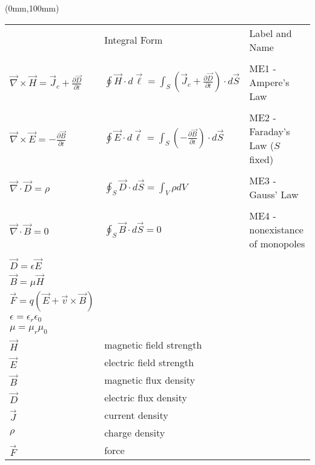 \begin{textblock*}{190.5mm}(0mm,100mm)
\tiny
\begin{tabular}{lll}
   \centering{Point Form} & Integral Form & Label and Name \\
              &               &                \\
    $\vec \nabla \times \vec H = {\vec J}_c + \frac{\partial {\vec D}}{\partial t}$ & 
    $\oint {\vec H} \cdot d {\vec \ell} = \int_S \left( {\vec J}_c + \frac{\partial {\vec D}}{\partial t} \right) \cdot d {\vec S}$ &
    ME1 - Ampere's Law\\
              &               &                \\     
    $\vec \nabla \times \vec E = -\frac{\partial \vec B}{\partial t}$ &
    $\oint \vec E \cdot d \vec \ell = \int_S \left(-\frac{\partial \vec B}{\partial t} \right) \cdot d \vec S$ &
    ME2 - Faraday's Law ($S$ fixed) \\
              &               &                \\     
    $\vec \nabla \cdot \vec D = \rho$ &
    $\oint_S \vec D \cdot d \vec S = \int_V \rho d V$ &
    ME3 - Gauss' Law\\
              &               &                \\     
    $\vec \nabla \cdot \vec B = 0$ &
    $\oint_S \vec B \cdot d \vec S = 0 $ &
    ME4 - nonexistance of monopoles    \\
              &               &                \\
    ${\vec D} = \epsilon {\vec E}$ & & \\
    ${\vec B} = \mu      {\vec H}$ & & \\
    ${\vec F} = q \left( {\vec E} + {\vec v} \times {\vec B} \right)$    & &    \\
    $\epsilon = \epsilon_r \epsilon_0$ & & \\
    $\mu      = \mu_r      \mu_0$      & & \\
    $\vec H$   & magnetic field strength & \\
    $\vec E$   & electric field strength & \\
    $\vec B$   & magnetic flux density   & \\
    $\vec D$   & electric flux density   & \\
    $\vec J$   & current density         & \\
    $\rho  $   & charge density          & \\
    $\vec F$   & force                   & \\

\end{tabular}
\end{textblock*}
